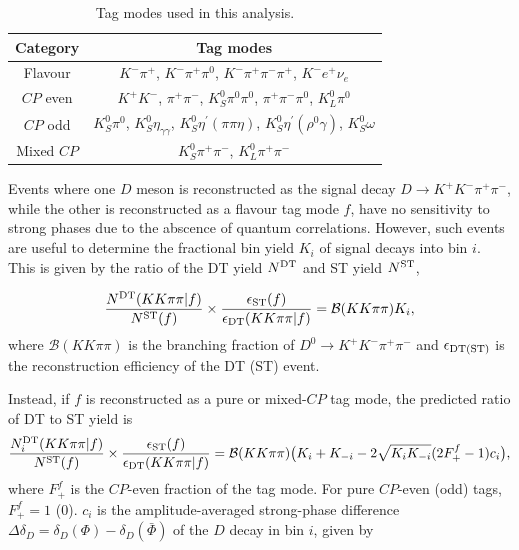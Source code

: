 \documentclass[12pt, a4paper, notitlepage, onecolumn]{article}
\begin{document}
\begin{table}[htb]
    \centering
    \caption{Tag modes used in this analysis.}
    \label{table:Tag_modes}
    \begin{tabular}{cc}
        \hline
        Category     & Tag modes \\
        \hline
        Flavour      & $K^-\pi^+$, $K^-\pi^+\pi^0$, $K^-\pi^+\pi^-\pi^+$, $K^-e^+\nu_e$ \\
        $C\!P$ even  & $K^+K^-$, $\pi^+\pi^-$, $K_S^0\pi^0\pi^0$, $\pi^+\pi^-\pi^0$, $K_L^0\pi^0$ \\
        $C\!P$ odd   & $K_S^0\pi^0$, $K_S^0\eta_{\gamma\gamma}$, $K_S^0\eta^\prime(\pi\pi\eta)$, $K_S^0\eta^\prime(\rho^0\gamma)$, $K_S^0\omega$ \\
        Mixed $C\!P$ & $K_S^0\pi^+\pi^-$, $K_L^0\pi^+\pi^-$ \\
        \hline
    \end{tabular}
\end{table}

Events where one $D$ meson is reconstructed as the signal decay $D\to K^+K^-\pi^+\pi^-$, while the other is reconstructed as a flavour tag mode $f$, have no sensitivity to strong phases due to the abscence of quantum correlations. However, such events are useful to determine the fractional bin yield $K_i$ of signal decays into bin $i$. This is given by the ratio of the DT yield $N^{\rm DT}$ and ST yield $N^{\rm ST}$,

\begin{equation}
    \frac{N^{\rm DT}(KK\pi\pi | f)}{N^{\rm ST}(f)}\times\frac{\epsilon_{\rm ST}(f)}{\epsilon_{\rm DT}(KK\pi\pi | f)} = \mathcal{B}(KK\pi\pi)K_i,
    \label{equation:Flavour_tag_Ki}
\end{equation}
where $\mathcal{B}(KK\pi\pi)$ is the branching fraction of $D^0\to K^+K^-\pi^+\pi^-$ and $\epsilon_{\rm DT(ST)}$ is the reconstruction efficiency of the DT (ST) event.

Instead, if $f$ is reconstructed as a pure or mixed-$C\!P$ tag mode, the predicted ratio of DT to ST yield is
\begin{equation}
    \frac{N_i^{\rm DT}(KK\pi\pi | f)}{N^{\rm ST}(f)}\times\frac{\epsilon_{\rm ST}(f)}{\epsilon_{\rm DT}(KK\pi\pi | f)} = \mathcal{B}(KK\pi\pi)\big(K_i + K_{-i} - 2\sqrt{K_iK_{-i}}(2F_+^{f} - 1)c_i\big),
    \label{equation:DT_ST_yield_ratio}
\end{equation}
where $F_+^f$ is the $C\!P$-even fraction of the tag mode. For pure $C\!P$-even (odd) tags, $F_+^f = 1$ ($0$). $c_i$ is the amplitude-averaged strong-phase difference $\Delta\delta_D = \delta_D(\Phi) - \delta_D(\bar{\Phi})$ of the $D$ decay in bin $i$, given by
\end{document}
